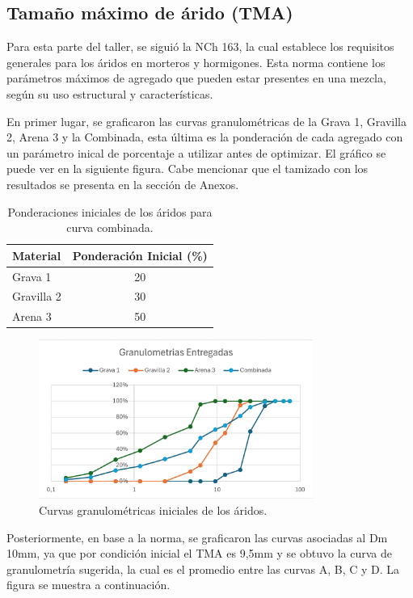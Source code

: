 \subsection{Tamaño máximo de árido (TMA)}

Para esta parte del taller, se siguió la NCh 163, la cual establece los requisitos generales para los áridos en morteros y hormigones. Esta norma contiene los parámetros máximos de agregado que pueden estar presentes en una mezcla, según su uso estructural y características.

En primer lugar, se graficaron las curvas granulométricas de la Grava 1, Gravilla 2, Arena 3 y la Combinada, esta última es la ponderación de cada agregado con un parámetro inical de porcentaje a utilizar antes de optimizar. El gráfico se puede ver en la siguiente figura. Cabe mencionar que el tamizado con los resultados se presenta en la sección de Anexos.

\begin{table}[H]
\centering
\caption{Ponderaciones iniciales de los áridos para curva combinada.}
\begin{tabular}{|l|c|}
\hline
\textbf{Material} & \textbf{Ponderación Inicial (\%)} \\ \hline
Grava 1     & 20 \\ \hline
Gravilla 2  & 30 \\ \hline
Arena 3     & 50 \\ \hline
\end{tabular}
\end{table}


\begin{figure}[H]
    \centering
    \includegraphics[width=0.8\textwidth]{GRAFICOS/granu_inicial.png}
    \caption{Curvas granulométricas iniciales de los áridos.}
\end{figure}

Posteriormente, en base a la norma, se graficaron las curvas asociadas al Dm 10mm, ya que por condición inicial el TMA es 9,5mm y se obtuvo la curva de granulometría sugerida, la cual es el promedio entre las curvas A, B, C y D. La figura se muestra a continuación.

